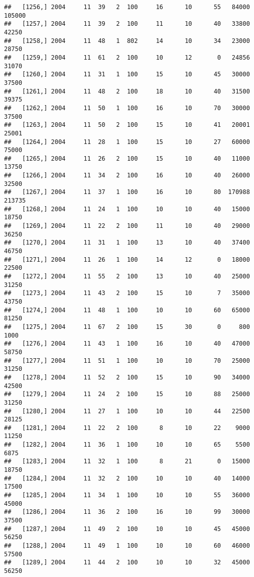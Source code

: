 \documentclass{article}\usepackage[]{graphicx}\usepackage[]{color}
\makeatletter
\newenvironment{kframe}{%
 \def\at@end@of@kframe{}%
 \ifinner\ifhmode%
  \def\at@end@of@kframe{\end{minipage}}%
  \begin{minipage}{\columnwidth}%
 \fi\fi%
 \def\FrameCommand##1{\hskip\@totalleftmargin \hskip-\fboxsep
 \colorbox{shadecolor}{##1}\hskip-\fboxsep
     \hskip-\linewidth \hskip-\@totalleftmargin \hskip\columnwidth}%
 \MakeFramed {\advance\hsize-\width
   \@totalleftmargin\z@ \linewidth\hsize
   \@setminipage}}%
 {\par\unskip\endMakeFramed%
 \at@end@of@kframe}
\newenvironment{knitrout}{}{} %
\makeatother
\begin{document}
\begin{knitrout}
\begin{kframe}
\begin{verbatim}
##   [1256,] 2004     11  39   2  100     16      10      55   84000  105000
##   [1257,] 2004     11  39   2  100     11      10      40   33800   42250
##   [1258,] 2004     11  48   1  802     14      10      34   23000   28750
##   [1259,] 2004     11  61   2  100     10      12       0   24856   31070
##   [1260,] 2004     11  31   1  100     15      10      45   30000   37500
##   [1261,] 2004     11  48   2  100     18      10      40   31500   39375
##   [1262,] 2004     11  50   1  100     16      10      70   30000   37500
##   [1263,] 2004     11  50   2  100     15      10      41   20001   25001
##   [1264,] 2004     11  28   1  100     15      10      27   60000   75000
##   [1265,] 2004     11  26   2  100     15      10      40   11000   13750
##   [1266,] 2004     11  34   2  100     16      10      40   26000   32500
##   [1267,] 2004     11  37   1  100     16      10      80  170988  213735
##   [1268,] 2004     11  24   1  100     10      10      40   15000   18750
##   [1269,] 2004     11  22   2  100     11      10      40   29000   36250
##   [1270,] 2004     11  31   1  100     13      10      40   37400   46750
##   [1271,] 2004     11  26   1  100     14      12       0   18000   22500
##   [1272,] 2004     11  55   2  100     13      10      40   25000   31250
##   [1273,] 2004     11  43   2  100     15      10       7   35000   43750
##   [1274,] 2004     11  48   1  100     10      10      60   65000   81250
##   [1275,] 2004     11  67   2  100     15      30       0     800    1000
##   [1276,] 2004     11  43   1  100     16      10      40   47000   58750
##   [1277,] 2004     11  51   1  100     10      10      70   25000   31250
##   [1278,] 2004     11  52   2  100     15      10      90   34000   42500
##   [1279,] 2004     11  24   2  100     15      10      88   25000   31250
##   [1280,] 2004     11  27   1  100     10      10      44   22500   28125
##   [1281,] 2004     11  22   2  100      8      10      22    9000   11250
##   [1282,] 2004     11  36   1  100     10      10      65    5500    6875
##   [1283,] 2004     11  32   1  100      8      21       0   15000   18750
##   [1284,] 2004     11  32   2  100     10      10      40   14000   17500
##   [1285,] 2004     11  34   1  100     10      10      55   36000   45000
##   [1286,] 2004     11  36   2  100     16      10      99   30000   37500
##   [1287,] 2004     11  49   2  100     10      10      45   45000   56250
##   [1288,] 2004     11  49   1  100     10      10      60   46000   57500
##   [1289,] 2004     11  44   2  100     10      10      32   45000   56250

\end{verbatim}
\end{kframe}
\end{knitrout}
\end{document}
